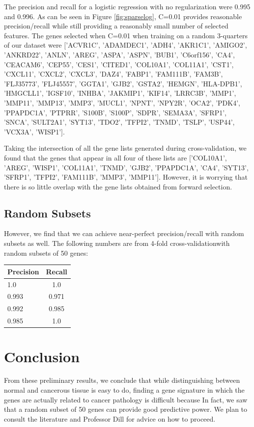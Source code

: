\documentclass[11pt]{article}
\begin{document}
The precision and recall for a logistic regression with no regularization were 0.995 and 0.996. As can be seen in Figure \ref{fig:sparselog}, C=0.01 provides reasonable precision/recall while still providing a reasonably small number of selected features. The genes selected when C=0.01 when training on a random 3-quarters of our dataset were $[$'ACVR1C', 'ADAMDEC1', 'ADH4', 'AKR1C1', 'AMIGO2', 'ANKRD22', 'ANLN', 'AREG', 'ASPA', 'ASPN', 'BUB1', 'C6orf156', 'CA4', 'CEACAM6', 'CEP55', 'CES1', 'CITED1', 'COL10A1', 'COL11A1', 'CST1', 'CXCL11', 'CXCL2', 'CXCL3', 'DAZ4', 'FABP1', 'FAM111B', 'FAM3B', 'FLJ35773', 'FLJ45557', 'GGTA1', 'GJB2', 'GSTA2', 'HEMGN', 'HLA-DPB1', 'HMGCLL1', 'IGSF10', 'INHBA', 'JAKMIP1', 'KIF14', 'LRRC3B', 'MMP1', 'MMP11', 'MMP13', 'MMP3', 'MUCL1', 'NPNT', 'NPY2R', 'OCA2', 'PDK4', 'PPAPDC1A', 'PTPRR', 'S100B', 'S100P', 'SDPR', 'SEMA3A', 'SFRP1', 'SNCA', 'SULT2A1', 'SYT13', 'TDO2', 'TFPI2', 'TNMD', 'TSLP', 'USP44', 'VCX3A', 'WISP1'$]$.

Taking the intersection of all the gene lists generated during cross-validation, we found that the genes that appear in all four of these lists are $[$'COL10A1', 'AREG', 'WISP1', 'COL11A1', 'TNMD', 'GJB2', 'PPAPDC1A', 'CA4', 'SYT13', 'SFRP1', 'TFPI2', 'FAM111B', 'MMP3', 'MMP11'$]$. However, it is worrying that there is so little overlap with the gene lists obtained from forward selection.

\subsection{Random Subsets}

However, we find that we can achieve near-perfect precision/recall with random subsets as well. The following numbers are from 4-fold cross-validationwith random subsets of 50 genes:
\begin{tabular}{ l | c }
    Precision & Recall\\
  \hline 
    1.0 & 1.0 \\
    0.993 & 0.971 \\
    0.992 & 0.985 \\
    0.985 & 1.0 \\
  \hline
\end{tabular}
\section{Conclusion}
From these preliminary results, we conclude that while distinguishing between normal and cancerous tissue is easy to do, finding a gene signature in which the genes are actually related to cancer pathology is difficult because In fact, we saw that a random subset of 50 genes can provide good predictive power. We plan to consult the literature and Professor Dill for advice on how to proceed. 
\end{document}
